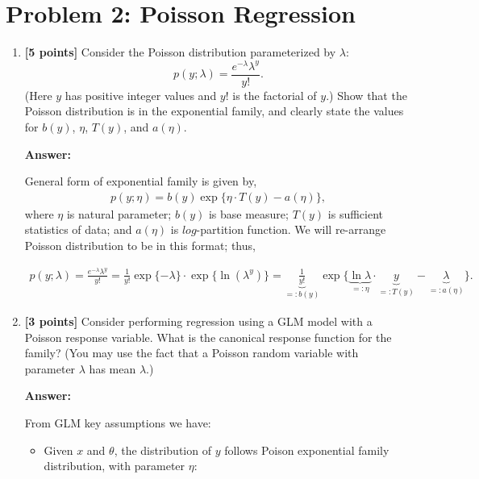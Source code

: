 \documentclass{article}
\begin{document}
\section*{Problem 2: Poisson Regression}

\begin{enumerate}[label=\alph*)]
    \item \textbf{[5 points]} Consider the Poisson distribution parameterized by $\lambda$:
\[ p(y; \lambda) = \frac{e^{-\lambda} \lambda^y}{y!}. \]
(Here $y$ has positive integer values and $y!$ is the factorial of $y$.) Show that the Poisson distribution is in the exponential family, and clearly state the values for $b(y)$, $\eta$, $T(y)$, and $a(\eta)$.

\textbf{Answer:}


    General form of exponential family is given by,
\begin{align*}
    p(y;\eta) = b(y)\exp\{\eta\cdot T(y) - a(\eta)\},
\end{align*}
where $\eta$ is natural parameter; $b(y)$ is base measure; $T(y)$ is sufficient statistics of data; and  $a(\eta)$ is $log$-partition function. We will re-arrange Poisson distribution to be in this format; thus,

\begin{align*}
    p(y;\lambda) = \frac{e^{-\lambda} \lambda^y}{y!} = \frac{1}{y!}\exp\{-\lambda\}\cdot\exp\{\ln(\lambda^y)\}= \boxed{\underbrace{\frac{1}{y!}}_{=:b(y)}\exp\{\underbrace{\ln\lambda}_{=:\eta}\cdot\underbrace{y}_{=:T(y)}-\underbrace{\lambda}_{=:a(\eta)}\}.}
\end{align*}






\item \textbf{[3 points]} Consider performing regression using a GLM model with a Poisson response variable. What is the canonical response function for the family? (You may use the fact that a Poisson random variable with parameter $\lambda$ has mean $\lambda$.)

\textbf{Answer:}


From GLM key assumptions we have:
\begin{itemize}
\item Given $x$ and $\theta$, the distribution of
$y$ follows Poison exponential family distribution, with parameter $\eta$:


\end{itemize}
\end{enumerate}
\end{document}
